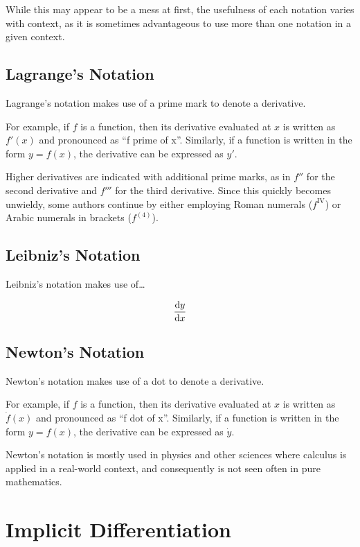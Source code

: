 \documentclass[headings=standardclasses]{scrreprt}
\begin{document}
While this may appear to be a mess at first, the usefulness of each notation
varies with context, as it is sometimes advantageous to use more than one
notation in a given context.

\subsection{Lagrange's Notation}

Lagrange's notation makes use of a prime mark to denote a derivative.

For example, if \(f\) is a function, then its derivative evaluated at \(x\) is
written as \(f'(x)\) and pronounced as \enquote{f prime of x}. Similarly, if a
function is written in the form \(y = f(x)\), the derivative can be expressed as
\(y'\).

Higher derivatives are indicated with additional prime marks, as in \(f''\) for
the second derivative and \(f'''\) for the third derivative. Since this quickly
becomes unwieldy, some authors continue by either employing Roman numerals
(\(f^{\mathrm{IV}}\)) or Arabic numerals in brackets (\(f^{(4)}\)).

\subsection{Leibniz's Notation}

Leibniz's notation makes use of\ldots

\[ \frac{\operatorname{d\!} y}{\operatorname{d\!} x} \]

\subsection{Newton's Notation}

Newton's notation makes use of a dot to denote a derivative.

For example, if \(f\) is a function, then its derivative evaluated at \(x\) is
written as \(\dot f(x)\) and pronounced as \enquote{f dot of x}. Similarly, if a
function is written in the form \(y = f(x)\), the derivative can be expressed as
\(\dot y\).

Newton's notation is mostly used in physics and other sciences where calculus is
applied in a real-world context, and consequently is not seen often in pure
mathematics.

\section{Implicit Differentiation}
\end{document}
